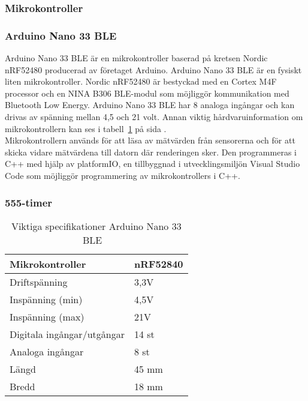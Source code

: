 \documentclass[a4paper]{article}
\begin{document}
\begin{sloppypar}
    \subsubsection{Mikrokontroller}
    \subsubsection{Arduino Nano 33 BLE}
    Arduino Nano 33 BLE är en mikrokontroller baserad på kretsen Nordic nRF52480 producerad av företaget Arduino.
    Arduino Nano 33 BLE är en fysiskt liten mikrokontroller. Nordic nRF52480 är bestyckad med en Cortex M4F processor
    och en NINA B306 BLE-modul som möjliggör kommunikation med Bluetooth Low Energy. Arduino Nano 33 BLE har 8 analoga
    ingångar och kan drivas av spänning mellan 4,5 och 21 volt. Annan viktig hårdvaruinformation om mikrokontrollern
    kan ses i tabell~\ref{table:ArduinoNano} på sida \pageref{table:ArduinoNano}. ~\cite{Arduino:ABX00030}\\

    Mikrokontrollern används för att läsa av mätvärden från sensorerna och för att skicka vidare mätvärdena till
    datorn där renderingen sker. Den programmeras i C++ med hjälp av platformIO, en tillbyggnad i utvecklingsmiljön
    Visual Studio Code som möjliggör programmering av mikrokontrollers i C++. \subsubsection{555-timer}

    \begin{table}
        \begin{center}
            \caption{Viktiga specifikationer Arduino Nano 33 BLE ~\cite{Arduino:ABX00030}}
            \label{table:ArduinoNano}
            \begin{tabular}{ | l | l | }
                \hline
                Mikrokontroller            & nRF52840 \\
                \hline
                Driftspänning              & 3,3V     \\
                \hline
                Inspänning (min)           & 4,5V     \\
                \hline
                Inspänning (max)           & 21V      \\
                \hline
                Digitala ingångar/utgångar & 14 st    \\
                \hline
                Analoga ingångar           & 8 st     \\
                \hline
                Längd                      & 45 mm    \\
                \hline
                Bredd                      & 18 mm    \\
                \hline
            \end{tabular}
        \end{center}
    \end{table}


\end{sloppypar}
\end{document}
